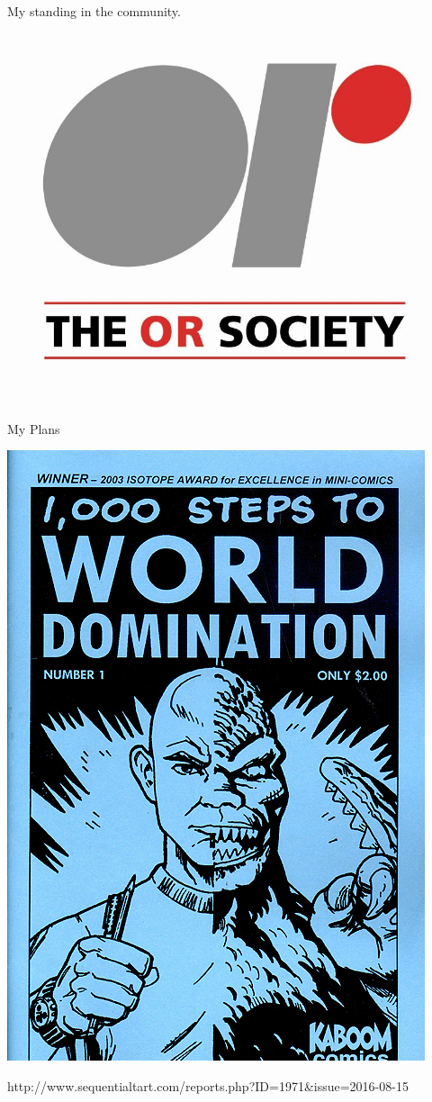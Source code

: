 \documentclass{beamer}
\begin{document}
\begin{frame}{My standing in the community.}
\begin{columns}
\begin{column}{0.4\textwidth}
            \begin{center}
                \includegraphics[width=\textwidth]{static/or-society-logo.jpg}
            \end{center} 
        \end{column}  
    \end{columns}
\end{frame}

\begin{frame}{My Plans}
	\begin{center}
		\includegraphics[width=.40\textwidth]{static/evil-mastermind.png}
	\end{center}

\hfill \tiny http://www.sequentialtart.com/reports.php?ID=1971\&issue=2016-08-15

\end{frame}
\end{document}
